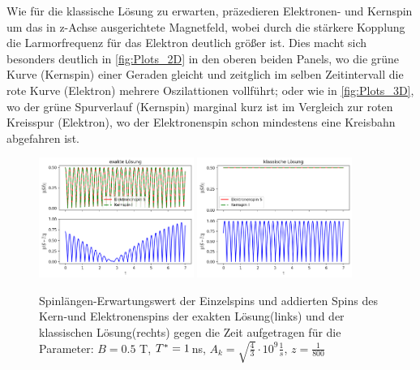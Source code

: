 Wie für die klassische Lösung zu erwarten, präzedieren Elektronen- und Kernspin um das in z-Achse ausgerichtete Magnetfeld, wobei durch die stärkere Kopplung
die Larmorfrequenz für das Elektron deutlich größer ist. Dies macht sich besonders deutlich in \autoref{fig:Plots_2D} in den oberen beiden 
Panels, wo die grüne Kurve (Kernspin) einer Geraden gleicht und zeitglich im selben Zeitintervall die rote Kurve (Elektron) mehrere Oszilattionen vollführt; 
oder wie in \autoref{fig:Plots_3D}, wo der grüne Spurverlauf (Kernspin) marginal kurz ist im Vergleich zur roten Kreisspur (Elektron), 
wo der Elektronenspin schon mindestens eine Kreisbahn abgefahren ist.\\ 
\begin{figure}[h]
    \centering
    \includegraphics[width = 0.45\textwidth]{Abbildungen/Plot_Spin_length.png}
    \includegraphics[width = 0.45\textwidth]{Abbildungen/Plot_Spin_length_Klassisch.png}
    \caption{Spinlängen-Erwartungswert der Einzelspins und addierten Spins des Kern-und Elektronenspins der exakten Lösung(links) und der klassischen 
    Lösung(rechts) gegen die Zeit aufgetragen für die Parameter: $B = 0.5$ T, $T^*= 1 \thinspace$ns, $A_k = \sqrt{\frac{4}{3}}\cdot 10^9 \frac{1}{s}$,
    $z=\frac{1}{800}$}
    \label{fig:Plots_Spinlength}
\end{figure}

